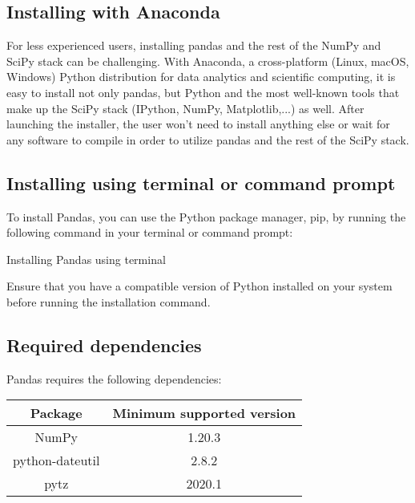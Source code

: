 	\subsection{Installing with Anaconda}
	
	For less experienced users, installing pandas and the rest of the NumPy and SciPy stack can be challenging.
	With Anaconda, a cross-platform (Linux, macOS, Windows) Python distribution for data analytics and scientific computing, it is easy to install not only pandas, but Python and the most well-known tools that make up the SciPy stack (IPython, NumPy, Matplotlib,...) as well.
	After launching the installer, the user won't need to install anything else or wait for any software to compile in order to utilize pandas and the rest of the SciPy stack.


	\subsection{Installing using terminal or command prompt}
	
	To install Pandas, you can use the Python package manager, pip, by running the following command in your terminal or command prompt:
	
		\begin{code}[h!]
			    
			
			\caption{Installing Pandas using terminal}
			
		\end{code}	
	
	Ensure that you have a compatible version of Python installed on your system before running the installation command.
	
	\subsection{Required dependencies}
	
	Pandas requires the following dependencies:

	\begin{center}
		\begin{tabular}{ |c|c| }
			\hline
			Package & Minimum supported version \\
			\hline
			NumPy & 1.20.3 \\
			python-dateutil & 2.8.2 \\
			pytz & 2020.1 \\
			\hline
		\end{tabular}
	\end{center}

